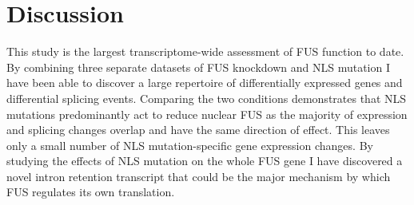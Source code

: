 


\clearpage
\section{Discussion}

This study is the largest transcriptome-wide assessment of FUS function to date.
By combining three separate datasets of FUS knockdown and NLS mutation I have been able to discover a large repertoire of differentially expressed genes and differential splicing events.
Comparing the two conditions demonstrates that NLS mutations predominantly act to reduce nuclear FUS as the majority of expression and splicing changes overlap and have the same direction of effect.
This leaves only a small number of NLS mutation-specific gene expression changes.
By studying the effects of NLS mutation on the whole FUS gene I have discovered a novel intron retention transcript that could be the major mechanism by which FUS regulates its own translation.








